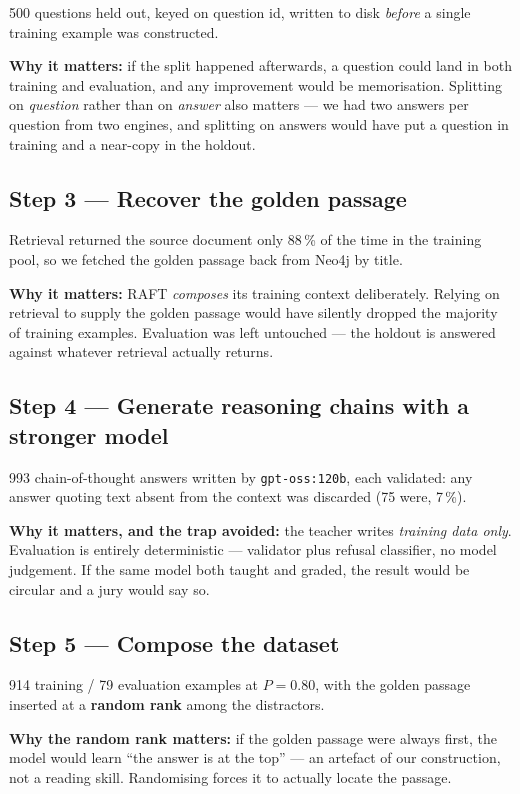 \documentclass[11pt,a4paper]{article}
\begin{document}
500 questions held out, keyed on question id, written to disk \emph{before} a single
training example was constructed.

\textbf{Why it matters:} if the split happened afterwards, a question could land in
both training and evaluation, and any improvement would be memorisation. Splitting
on \emph{question} rather than on \emph{answer} also matters --- we had two answers
per question from two engines, and splitting on answers would have put a question
in training and a near-copy in the holdout.

\subsection{Step 3 --- Recover the golden passage}

Retrieval returned the source document only 88\,\% of the time in the training
pool, so we fetched the golden passage back from Neo4j by title.

\textbf{Why it matters:} RAFT \emph{composes} its training context deliberately.
Relying on retrieval to supply the golden passage would have silently dropped the
majority of training examples. Evaluation was left untouched --- the holdout is
answered against whatever retrieval actually returns.

\subsection{Step 4 --- Generate reasoning chains with a stronger model}

993 chain-of-thought answers written by \texttt{gpt-oss:120b}, each validated:
any answer quoting text absent from the context was discarded (75 were, 7\,\%).

\textbf{Why it matters, and the trap avoided:} the teacher writes \emph{training
data only}. Evaluation is entirely deterministic --- validator plus refusal
classifier, no model judgement. If the same model both taught and graded, the
result would be circular and a jury would say so.

\subsection{Step 5 --- Compose the dataset}

914 training / 79 evaluation examples at $P = 0.80$, with the golden passage
inserted at a \textbf{random rank} among the distractors.

\textbf{Why the random rank matters:} if the golden passage were always first, the
model would learn ``the answer is at the top'' --- an artefact of our construction,
not a reading skill. Randomising forces it to actually locate the passage.
\end{document}
